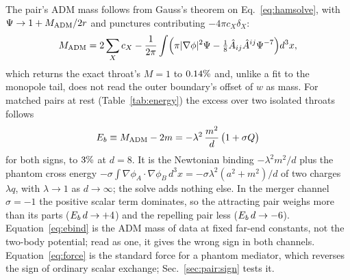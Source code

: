 \documentclass[twocolumn,floatfix,aps,prd,superscriptaddress,nofootinbib]{revtex4-2}
\begin{document}
The pair's ADM mass follows from Gauss's theorem on Eq.~\eqref{eq:hamsolve}, with $\Psi\to1+M_{\rm ADM}/2r$ and punctures contributing $-4\pi c_X\delta_X$:
\begin{equation}
M_{\rm ADM}=2\sum_X c_X-\frac1{2\pi}\int\Bigl(\pi|\nabla\phi|^2\Psi-\tfrac18\hat A_{ij}\hat A^{ij}\Psi^{-7}\Bigr)d^3x ,
\label{eq:madmvol}
\end{equation}
which returns the exact throat's $M=1$ to $0.14\%$ and, unlike a fit to the monopole tail, does not read the outer boundary's offset of $w$ as mass. For matched pairs at rest (Table~\ref{tab:energy}) the excess over two isolated throats follows
\begin{equation}
E_b\equiv M_{\rm ADM}-2m=-\lambda^2\,\frac{m^2}{d}\,\bigl(1+\sigma Q\bigr)
\label{eq:ebind}
\end{equation}
for both signs, to $3\%$ at $d=8$. It is the Newtonian binding $-\lambda^2m^2/d$ plus the phantom cross energy $-\sigma\!\int\nabla\phi_A\!\cdot\!\nabla\phi_B\,d^3x=-\sigma\lambda^2(a^2+m^2)/d$ of two charges $\lambda q$, with $\lambda\to1$ as $d\to\infty$; the solve adds nothing else. In the merger channel $\sigma=-1$ the positive scalar term dominates, so the attracting pair weighs more than its parts ($E_b\,d\to+4$) and the repelling pair less ($E_b\,d\to-6$). Equation~\eqref{eq:ebind} is the ADM mass of data at fixed far-end constants, not the two-body potential; read as one, it gives the wrong sign in both channels. Equation~\eqref{eq:force} is the standard force for a phantom mediator, which reverses the sign of ordinary scalar exchange; Sec.~\ref{sec:pair:sign} tests it.
\end{document}
